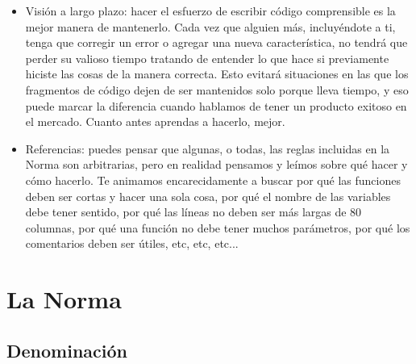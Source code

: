\documentclass{42-es}
\begin{document}
\begin{itemize}
      \item Visión a largo plazo: hacer el esfuerzo de escribir código
            comprensible es la mejor manera de mantenerlo. Cada vez que alguien
            más, incluyéndote a ti, tenga que corregir un error o agregar una
            nueva característica, no tendrá que perder su valioso tiempo
            tratando de entender lo que hace si previamente hiciste las cosas
            de
            la manera correcta. Esto evitará situaciones en las que los
            fragmentos de código dejen de ser mantenidos solo porque lleva
            tiempo, y eso puede marcar la diferencia cuando hablamos de tener
            un
            producto exitoso en el mercado. Cuanto antes aprendas a hacerlo,
            mejor.

      \item Referencias: puedes pensar que algunas, o todas, las reglas
            incluidas
            en la Norma son arbitrarias, pero en realidad pensamos y leímos
            sobre
            qué hacer y cómo hacerlo. Te animamos encarecidamente a buscar por
            qué
            las funciones deben ser cortas y hacer una sola cosa, por qué el
            nombre de las variables debe tener sentido, por qué las líneas no
            deben ser más largas de 80 columnas, por qué una función no debe
            tener muchos parámetros, por qué los comentarios deben ser útiles,
            etc, etc, etc...

\end{itemize}

\newpage

\chapter{La Norma}

\section{Denominación}
\end{document}
